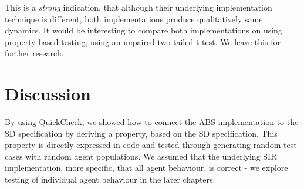 %

%

%

This is a \textit{strong} indication, that although their underlying implementation technique is different, both implementations produce qualitatively same dynamics. It would be interesting to compare both implementations on using property-based testing, using an unpaired two-tailed t-test. We leave this for further research.

\section{Discussion}
By using QuickCheck, we showed how to connect the ABS implementation to the SD specification by deriving a property, based on the SD specification. This property is directly expressed in code and tested through generating random test-cases with random agent populations. We assumed that the underlying SIR implementation, more specific, that all agent behaviour, is correct - we explore testing of individual agent behaviour in the later chapters.

